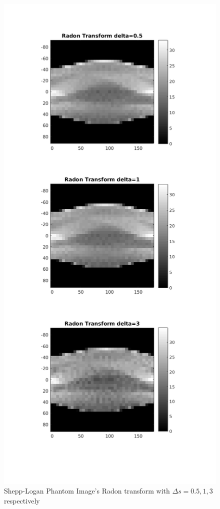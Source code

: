 \documentclass[11pt]{article}
\begin{document}
\begin{figure}[h]
\centering
\includegraphics[scale=0.45]{c}
\caption{Shepp-Logan Phantom Image's Radon transform with $\Delta s = 0.5,1,3$ respectively}
\end{figure}
\end{document}
